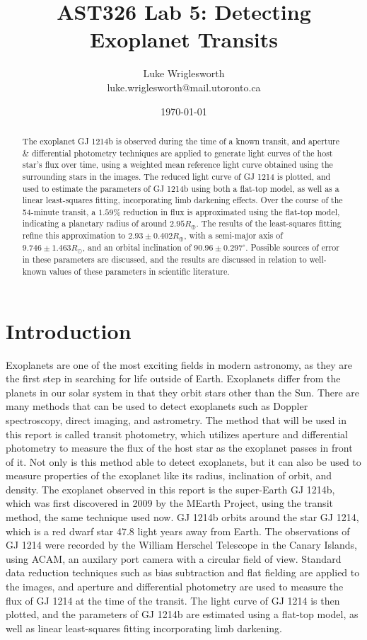 \documentclass{article}
\title{AST326 Lab 5: Detecting Exoplanet Transits}
\author{Luke Wriglesworth \\ \small luke.wriglesworth@mail.utoronto.ca}
\date{\today}
\begin{document}
\maketitle

\begin{abstract}
The exoplanet GJ 1214b is observed during the time of a known transit, and aperture \& differential photometry techniques are applied to 
generate light curves of the host star's flux over time, using a weighted mean reference light curve obtained using the surrounding stars in the images. The reduced light curve of GJ 1214 is plotted, and used to estimate the parameters of GJ 1214b using both a flat-top model, 
as well as a linear least-squares fitting, incorporating limb darkening effects. Over the course of the 54-minute transit, a $1.59\%$ reduction in flux is approximated using the flat-top model, indicating a
planetary radius of around $2.95R_{\oplus}$. The results of the least-squares fitting refine this approximation to $2.93 \pm 0.402 R_{\oplus}$, with
a semi-major axis of $9.746 \pm 1.463 R_{\odot}$, and an orbital inclination of $90.96 \pm 0.297^\circ$. Possible sources of error in these parameters are discussed, and the results are 
discussed in relation to well-known values of these parameters in scientific literature. 


\end{abstract}

\section{Introduction}
Exoplanets are one of the most exciting fields in modern astronomy, as they are the first step in searching for life outside of Earth. 
Exoplanets differ from the planets in our solar system in that they orbit stars other than the Sun. There are many methods that can be used to detect
exoplanets such as Doppler spectroscopy, direct imaging, and astrometry. The method that will be used in this report is called
transit photometry, which utilizes aperture and differential photometry to measure the flux of the host star as the exoplanet passes in front of it.
Not only is this method able to detect exoplanets, but it can also be used to measure properties of the exoplanet like its radius, inclination of orbit, and density.
The exoplanet observed in this report is the super-Earth GJ 1214b, which was first discovered in 2009 by the MEarth Project, using the transit method, the same technique used now. GJ 1214b orbits around the star
GJ 1214, which is a red dwarf star 47.8 light years away from Earth. The observations of GJ 1214 were recorded by the William Herschel Telescope in the Canary Islands, using ACAM, an auxilary 
port camera with a circular field of view. Standard data reduction techniques such as bias subtraction and flat fielding are applied to the images, and aperture and differential photometry are used to measure the flux of GJ 1214 
at the time of the transit. The light curve of GJ 1214 is then plotted, and the parameters of GJ 1214b are estimated using a flat-top model, as well as linear least-squares fitting incorporating limb darkening.
\end{document}
